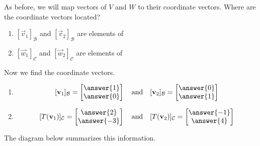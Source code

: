 \documentclass{ximera}
\begin{document}
\begin{exploration}
As before, we will map vectors of $V$ and $W$ to their coordinate vectors.  Where are the coordinate vectors located? 
\begin{enumerate}
    \item $[\vec{v}_1]_{\mathcal{B}}$ and $[\vec{v}_2]_{\mathcal{B}}$ are elements of 
     \item $[\vec{w}_1]_{\mathcal{C}}$ and $[\vec{w}_2]_{\mathcal{C}}$ are elements of 
\end{enumerate}
Now we find the coordinate vectors.
\begin{enumerate}
     \item 
     $$[\vec{v}_1]_{\mathcal{B}}=\begin{bmatrix}\answer{1}\\\answer{0}\end{bmatrix}\quad\text{and}\quad [\vec{v}_2]_{\mathcal{B}}=\begin{bmatrix}\answer{0}\\\answer{1}\end{bmatrix}$$
     \item 
     $$[T(\vec{v}_1)]_{\mathcal{C}}=\begin{bmatrix}\answer{2}\\\answer{-3}\end{bmatrix}\quad\text{and}\quad [T(\vec{v}_2)]_{\mathcal{C}}=\begin{bmatrix}\answer{-1}\\\answer{4}\end{bmatrix}$$
\end{enumerate}

The diagram below summarizes this information.
\begin{center}
\end{center}
\end{exploration}
\end{document}
